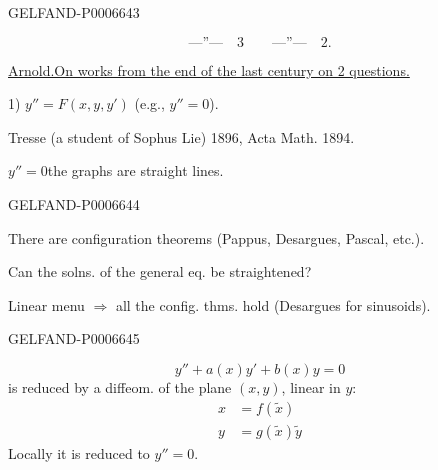\begin{GelfandAdjacentEvidence}{GELFAND-P000664}{3}

\[
\text{---''---}\quad 3\qquad \text{---''---}\quad 2.
\]

\underline{Arnold.}\quad\underline{On works from the end of the last century on 2 questions.}

1) \(y''=F(x,y,y')\) (e.g., \(y''=0\)).

Tresse (a student of Sophus Lie) 1896, Acta Math. 1894.

\(y''=0\)\quad the graphs are straight lines.
\end{GelfandAdjacentEvidence}
\begin{GelfandAdjacentEvidence}{GELFAND-P000664}{4}


There are configuration theorems (Pappus, Desargues, Pascal, etc.).

Can the solns. of the general eq. be straightened?

Linear menu \(\Longrightarrow\) all the config. thms. hold (Desargues for sinusoids).
\end{GelfandAdjacentEvidence}
\begin{GelfandAdjacentEvidence}{GELFAND-P000664}{5}

\end{GelfandAdjacentEvidence}

\[
y''+a(x)y'+b(x)y=0
\]
is reduced by a diffeom. of the plane \((x,y)\), linear in \(y\):
\[
\begin{aligned}
x&=f(\tilde x)\\
y&=g(\tilde x)\tilde y
\end{aligned}
\]
Locally it is reduced to \(y''=0\).


